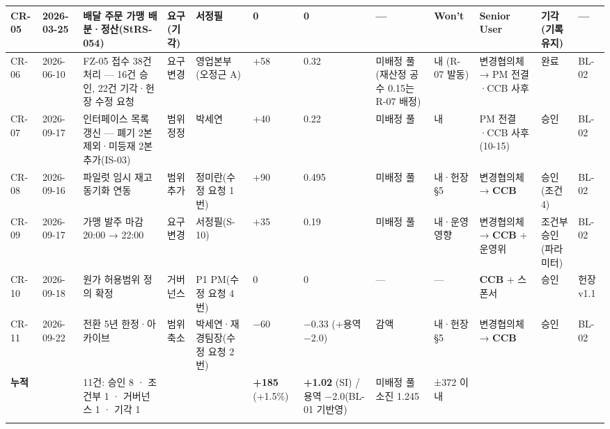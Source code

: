 \documentclass[10pt,a4paper]{article}
\begin{document}
{\begin{longtable}{|L{11mm}|L{15mm}|L{52mm}|L{16mm}|L{24mm}|C{10mm}|C{14mm}|L{24mm}|L{16mm}|L{28mm}|L{20mm}|L{12mm}|}
CR-05 & 2026-03-25 & 배달 주문 가맹 배분·정산(StRS-054) & 요구(기각) & 서정필 & 0 & 0 & — & Won't & Senior User & \textbf{기각} (기록 유지) & — \\ \hline
CR-06 & 2026-06-10 & FZ-05 접수 38건 처리 — 16건 승인, 22건 기각·헌장 수정 요청 & 요구 변경 & 영업본부(오정근 A) & +58 & 0.32 & 미배정 풀(재산정 공수 0.15는 R-07 배정) & 내 (R-07 발동) & 변경협의체 → PM 전결·CCB 사후 & 완료 & BL-02 \\ \hline
CR-07 & 2026-09-17 & 인터페이스 목록 갱신 — 폐기 2본 제외·미등재 2본 추가(IS-03) & 범위 정정 & 박세연 & +40 & 0.22 & 미배정 풀 & 내 & PM 전결·CCB 사후(10-15) & 승인 & BL-02 \\ \hline
CR-08 & 2026-09-16 & 파일럿 임시 재고 동기화 연동 & 범위 추가 & 정미란(수정 요청 1번) & +90 & 0.495 & 미배정 풀 & 내·헌장 §5 & 변경협의체 → \textbf{CCB} & 승인(조건 4) & BL-02 \\ \hline
CR-09 & 2026-09-17 & 가맹 발주 마감 20:00 → 22:00 & 요구 변경 & 서정필(S-10) & +35 & 0.19 & 미배정 풀 & 내·운영 영향 & 변경협의체 → \textbf{CCB} + 운영위 & 조건부 승인(파라미터) & BL-02 \\ \hline
CR-10 & 2026-09-18 & 원가 허용범위 정의 확정 & 거버넌스 & P1 PM(수정 요청 4번) & 0 & 0 & — & — & \textbf{CCB} + 스폰서 & 승인 & 헌장 v1.1 \\ \hline
CR-11 & 2026-09-22 & 전환 5년 한정·아카이브 & 범위 축소 & 박세연·재경팀장(수정 요청 2번) & −60 & −0.33 (+용역 −2.0) & 감액 & 내·헌장 §5 & 변경협의체 → \textbf{CCB} & 승인 & BL-02 \\ \hline
\textbf{누적} & & 11건: 승인 8 · 조건부 1 · 거버넌스 1 · 기각 1 & & & \textbf{+185} (+1.5\%) & \textbf{+1.02} (SI) / 용역 −2.0(BL-01 기반영) & 미배정 풀 소진 1.245 & ±372 이내 & & & \\ \hline
\fi
\end{longtable}}
\landscapeoff
\end{document}
